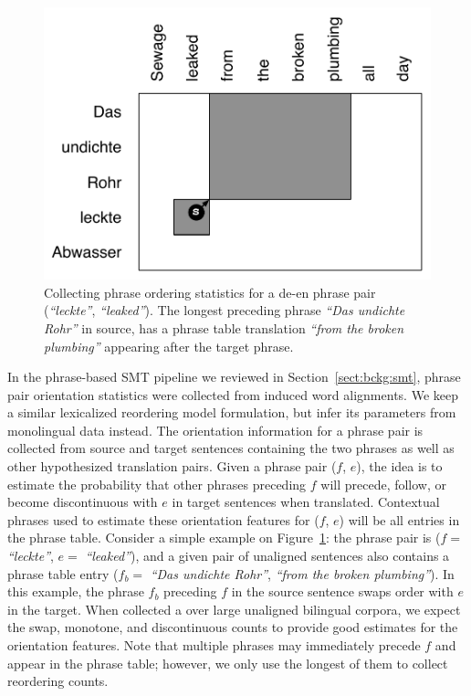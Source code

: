 \documentclass[11pt]{article}
\newcommand{\mnote}[1]{\marginpar{%
  \vskip-\baselineskip
  \raggedright\footnotesize
  \itshape\hrule\smallskip\tiny{#1}\par\smallskip\hrule}}
\newcommand{\mtodo}[1]{\mnote{\textcolor{red}{#1}}}
\newcommand{\secref}[1]{Section~\ref{#1}}
\newcommand{\figref}[1]{Figure~\ref{#1}}
\newcommand{\emq}[1]{\emph{``#1''}}
\begin{document}
\begin{figure}[t]
\begin{center}
\includegraphics[width=0.8 \linewidth]{../figures/monoreord/monoreord.pdf}
\caption{Collecting phrase ordering statistics for a de-en phrase pair (\emq{leckte}, \emq{leaked}).  The longest preceding phrase \emq{Das undichte Rohr} in source, has a phrase table translation \emq{from the broken plumbing} appearing after the target phrase.}
\label{fig:monoreord}
\end{center}
\vskip -0.2in
\end{figure}

In the phrase-based SMT pipeline we reviewed in \secref{sect:bckg:smt}, phrase pair orientation statistics were collected from induced word alignments.  We keep a similar lexicalized reordering model formulation, but infer its parameters from monolingual data instead.  The orientation information for a phrase pair is collected from source and target sentences containing the two phrases as well as other hypothesized translation pairs.  Given a phrase pair ($f$, $e$), the idea is to estimate the probability that other phrases preceding $f$ will precede, follow, or become discontinuous with $e$ in target sentences when translated.  Contextual phrases used to estimate these orientation features for ($f$, $e$) will be all entries in the phrase table.  Consider a simple example on \figref{fig:monoreord}: the phrase pair is ($f =$ \emq{leckte}, $e =$ \emq{leaked}), and a given pair of unaligned sentences also contains a phrase table entry ($f_{b} =$ \emq{Das undichte Rohr}, \emq{from the broken plumbing}).  In this example, the phrase $f_{b}$ preceding $f$ in the source sentence swaps order with $e$ in the target.  When collected a over large unaligned bilingual corpora, we expect the swap, monotone, and discontinuous counts to provide good estimates for the orientation features.  Note that multiple phrases may immediately precede $f$ and appear in the phrase table; however, we only use the longest of them to collect reordering counts.\mtodo{Explain why?}
\end{document}
